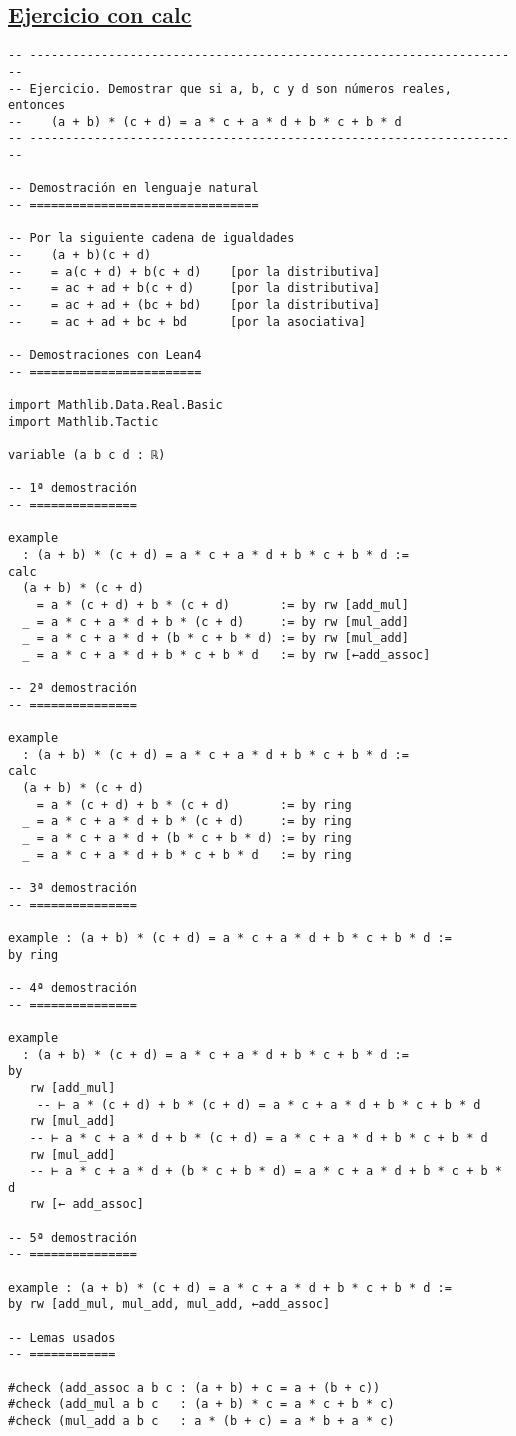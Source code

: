 \subsection{\href{./src/Basicos/Ejercicio\_con\_calc.lean}{Ejercicio con calc}}
\label{sec:org79363fd}
\begin{verbatim}
-- ---------------------------------------------------------------------
-- Ejercicio. Demostrar que si a, b, c y d son números reales, entonces
--    (a + b) * (c + d) = a * c + a * d + b * c + b * d
-- ---------------------------------------------------------------------

-- Demostración en lenguaje natural
-- ================================

-- Por la siguiente cadena de igualdades
--    (a + b)(c + d)
--    = a(c + d) + b(c + d)    [por la distributiva]
--    = ac + ad + b(c + d)     [por la distributiva]
--    = ac + ad + (bc + bd)    [por la distributiva]
--    = ac + ad + bc + bd      [por la asociativa]

-- Demostraciones con Lean4
-- ========================

import Mathlib.Data.Real.Basic
import Mathlib.Tactic

variable (a b c d : ℝ)

-- 1ª demostración
-- ===============

example
  : (a + b) * (c + d) = a * c + a * d + b * c + b * d :=
calc
  (a + b) * (c + d)
    = a * (c + d) + b * (c + d)       := by rw [add_mul]
  _ = a * c + a * d + b * (c + d)     := by rw [mul_add]
  _ = a * c + a * d + (b * c + b * d) := by rw [mul_add]
  _ = a * c + a * d + b * c + b * d   := by rw [←add_assoc]

-- 2ª demostración
-- ===============

example
  : (a + b) * (c + d) = a * c + a * d + b * c + b * d :=
calc
  (a + b) * (c + d)
    = a * (c + d) + b * (c + d)       := by ring
  _ = a * c + a * d + b * (c + d)     := by ring
  _ = a * c + a * d + (b * c + b * d) := by ring
  _ = a * c + a * d + b * c + b * d   := by ring

-- 3ª demostración
-- ===============

example : (a + b) * (c + d) = a * c + a * d + b * c + b * d :=
by ring

-- 4ª demostración
-- ===============

example
  : (a + b) * (c + d) = a * c + a * d + b * c + b * d :=
by
   rw [add_mul]
    -- ⊢ a * (c + d) + b * (c + d) = a * c + a * d + b * c + b * d
   rw [mul_add]
   -- ⊢ a * c + a * d + b * (c + d) = a * c + a * d + b * c + b * d
   rw [mul_add]
   -- ⊢ a * c + a * d + (b * c + b * d) = a * c + a * d + b * c + b * d
   rw [← add_assoc]

-- 5ª demostración
-- ===============

example : (a + b) * (c + d) = a * c + a * d + b * c + b * d :=
by rw [add_mul, mul_add, mul_add, ←add_assoc]

-- Lemas usados
-- ============

#check (add_assoc a b c : (a + b) + c = a + (b + c))
#check (add_mul a b c   : (a + b) * c = a * c + b * c)
#check (mul_add a b c   : a * (b + c) = a * b + a * c)
\end{verbatim}

